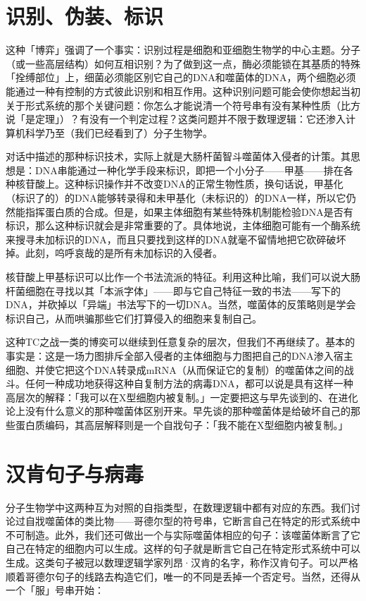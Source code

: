 \documentclass[
  12pt,
  twoside,
  openright,
  oldfontcommands,
]{memoir}
\begin{document}
\section{识别、伪装、标识}

这种「博弈」强调了一个事实：识别过程是细胞和亚细胞生物学的中心主题。分子（或一些高层结构）如何互相识别？为了做到这一点，酶必须能锁在其基质的特殊「拴缚部位」上，细菌必须能区别它自己的DNA和噬菌体的DNA，两个细胞必须能通过一种有控制的方式彼此识别和相互作用。这种识别问题可能会使你想起当初关于形式系统的那个关键问题：你怎么才能说清一个符号串有没有某种性质（比方说「是定理」）？有没有一个判定过程？这类问题并不限于数理逻辑：它还渗入计算机科学乃至（我们已经看到了）分子生物学。

对话中描述的那种标识技术，实际上就是大肠杆菌智斗噬菌体入侵者的计策。其思想是：DNA串能通过一种化学手段来标识，即把一个小分子------甲基------排在各种核苷酸上。这种标识操作并不改变DNA的正常生物性质，换句话说，甲基化（标识了的）的DNA能够转录得和未甲基化（未标识的）的DNA一样，所以它仍然能指挥蛋白质的合成。但是，如果主体细胞有某些特殊机制能检验DNA是否有标识，那么这种标识就会是非常重要的了。具体地说，主体细胞可能有一个酶系统来搜寻未加标识的DNA，而且只要找到这样的DNA就毫不留情地把它砍碎破坏掉。此刻，呜呼哀哉的是所有未加标识的入侵者。

核苷酸上甲基标识可以比作一个书法流派的特征。利用这种比喻，我们可以说大肠杆菌细胞在寻找以其「本派字体」------即与它自己特征一致的书法------写下的DNA，并砍掉以「异端」书法写下的一切DNA。当然，噬菌体的反策略则是学会标识自己，从而哄骗那些它们打算侵入的细胞来复制自己。

这种TC之战一类的博奕可以继续到任意复杂的层次，但我们不再继续了。基本的事实是：这是一场力图排斥全部入侵者的主体细胞与力图把自己的DNA渗入宿主细胞、并使它把这个DNA转录成mRNA（从而保证它的复制）的噬菌体之间的战斗。任何一种成功地获得这种自复制方法的病毒DNA，都可以说是具有这样一种高层次的解释：「我可以在X型细胞内被复制。」一定要把这与早先谈到的、在进化论上没有什么意义的那种噬菌体区别开来。早先谈的那种噬菌体是给破坏自己的那些蛋白质编码，其高层解释则是一个自戕句子：「我不能在X型细胞内被复制。」

\section{汉肯句子与病毒}

分子生物学中这两种互为对照的自指类型，在数理逻辑中都有对应的东西。我们讨论过自戕噬菌体的类比物------哥德尔型的符号串，它断言自己在特定的形式系统中不可制造。此外，我们还可做出一个与实际噬菌体相应的句子：该噬菌体断言了它自己在特定的细胞内可以生成。这样的句子就是断言它自己在特定形式系统中可以生成。这类句子被冠以数理逻辑学家列昂·汉肯的名字，称作汉肯句子。可以严格顺着哥德尔句子的线路去构造它们，唯一的不同是丢掉一个否定号。当然，还得从一个「服」号串开始：
\end{document}
